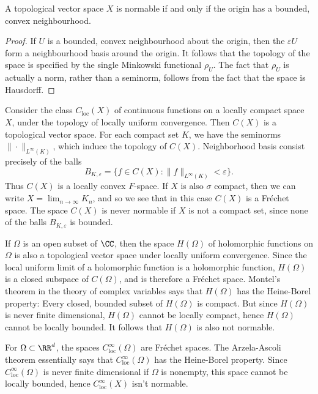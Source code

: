 \begin{theorem}
    A topological vector space $X$ is normable if and only if the origin has a bounded, convex neighbourhood.
\end{theorem}
\begin{proof}
    If $U$ is a bounded, convex neighbourhood about the origin, then the $\varepsilon U$ form a neighbourhood basis around the origin. It follows that the topology of the space is specified by the single Minkowski functional $\rho_U$. The fact that $\rho_U$ is actually a norm, rather than a seminorm, follows from the fact that the space is Hausdorff.
\end{proof}

\begin{example}
    Consider the class $C_{\text{loc}}(X)$ of continuous functions on a locally compact space $X$, under the topology of locally uniform convergence. Then $C(X)$ is a topological vector space. For each compact set $K$, we have the seminorms $\| \cdot \|_{L^\infty(K)}$, which induce the topology of $C(X)$. Neighborhood basis consist precisely of the balls
    \[ B_{K,\varepsilon} = \{ f \in C(X): \| f \|_{L^\infty(K)} < \varepsilon \}. \]
    Thus $C(X)$ is a locally convex $F$-space. If $X$ is also $\sigma$ compact, then we can write $X = \lim_{n \to \infty} K_n$, and so we see that in this case $C(X)$ is a Fr\'{e}chet space. The space $C(X)$ is never normable if $X$ is not a compact set, since none of the balls $B_{K,\varepsilon}$ is bounded.
\end{example}

\begin{example}
    If $\Omega$ is an open subset of $\CC$, then the space $H(\Omega)$ of holomorphic functions on $\Omega$ is also a topological vector space under locally uniform convergence. Since the local uniform limit of a holomorphic function is a holomorphic function, $H(\Omega)$ is a closed subspace of $C(\Omega)$, and is therefore a Fr\'{e}chet space. Montel's theorem in the theory of complex variables says that $H(\Omega)$ has the Heine-Borel property: Every closed, bounded subset of $H(\Omega)$ is compact. But since $H(\Omega)$ is never finite dimensional, $H(\Omega)$ cannot be locally compact, hence $H(\Omega)$ cannot be locally bounded. It follows that $H(\Omega)$ is also not normable.
\end{example}

\begin{example}
    For $\Omega \subset \RR^d$, the spaces $C^\infty_{\text{loc}}(\Omega)$ are Fr\'{e}chet spaces. The Arzela-Ascoli theorem essentially says that $C^\infty_{\text{loc}}(\Omega)$ has the Heine-Borel property. Since $C^\infty_{\text{loc}}(\Omega)$ is never finite dimensional if $\Omega$ is nonempty, this space cannot be locally bounded, hence $C^\infty_{\text{loc}}(X)$ isn't normable.
\end{example}

